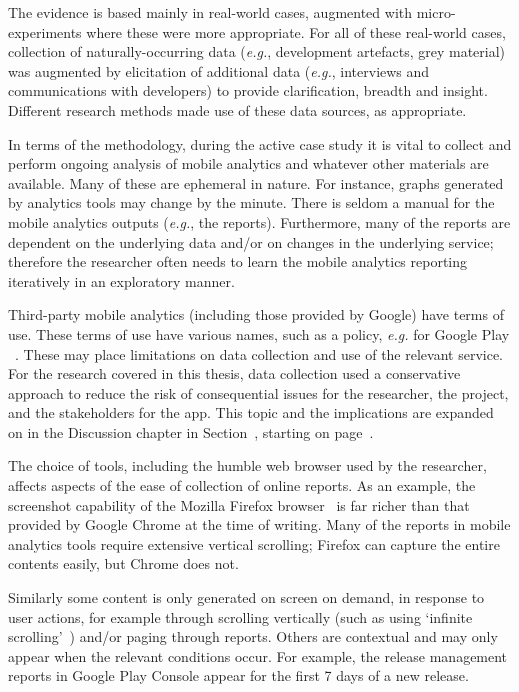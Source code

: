 The evidence is based mainly in real-world cases, augmented with micro-experiments where these were more appropriate. For all of these real-world cases, collection of naturally-occurring data (\textit{e.g.}, development artefacts, grey material) was augmented by elicitation of additional data (\textit{e.g.}, interviews and communications with developers) to provide clarification, breadth and insight.  Different research methods made use of these data sources, as appropriate.

In terms of the methodology, during the active case study it is vital to collect and perform ongoing analysis of mobile analytics and whatever other materials are available. Many of these are ephemeral in nature. For instance, graphs generated by analytics tools may change by the minute. There is seldom a manual for the mobile analytics outputs (\textit{e.g.}, the reports). Furthermore, many of the reports are dependent on the underlying data and/or on changes in the underlying service; therefore the researcher often needs to learn the mobile analytics reporting iteratively in an exploratory manner.


Third-party mobile analytics (including those provided by Google) have terms of use. These terms of use have various names, such as a policy, \textit{e.g.} for Google Play ~. These may place limitations on data collection and use of the relevant service. For the research covered in this thesis, data collection used a conservative approach to reduce the risk of consequential issues for the researcher, the project, and the stakeholders for the app. This topic and the implications are expanded on in the Discussion chapter in Section~, starting on page~\pageref{discussion-on-methodology-and-case-study-procedure}.

The choice of tools, including the humble web browser used by the researcher, affects aspects of the ease of collection of online reports. As an example, the screenshot capability of the Mozilla Firefox browser~ is far richer than that provided by Google Chrome at the time of writing. Many of the reports in mobile analytics tools require extensive vertical scrolling; Firefox can capture the entire contents easily, but Chrome does not. 

Similarly some content is only generated on screen on demand, in response to user actions, for example through scrolling vertically (such as using `infinite scrolling'~) and/or paging through reports. Others are contextual and may only appear when the relevant conditions occur. For example, the release management reports in Google Play Console appear for the first 7 days of a new release. 

